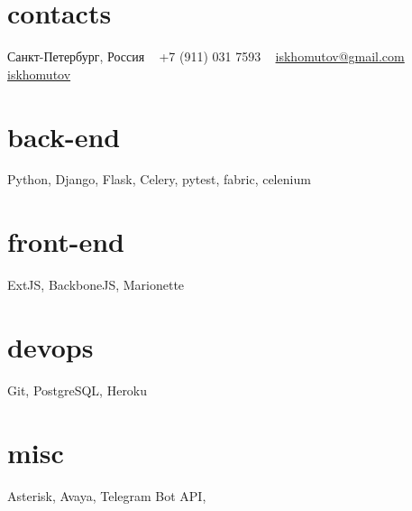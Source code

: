 \documentclass[]{cv-style}
\begin{document}


\begin{aside}
%
%
\section{contacts}
\faMapMarker{} Санкт-Петербург, Россия
~
\faMobilePhone{} +7 (911) 031 7593
~
\faEnvelope{} \href{mailto:iskhomutov@gmail.com}{iskhomutov@gmail.com}
~
\faGithub{} \href{http://github.com/iskhomutov}{iskhomutov}
%
\section{back-end}
Python, Django, Flask, Celery, pytest, fabric, celenium
%
\section{front-end}
ExtJS, BackboneJS, Marionette
%
\section{devops}
Git, PostgreSQL, Heroku
%
\section{misc}
Asterisk, Avaya, Telegram Bot API, 
%
\end{aside}
\end{document}
